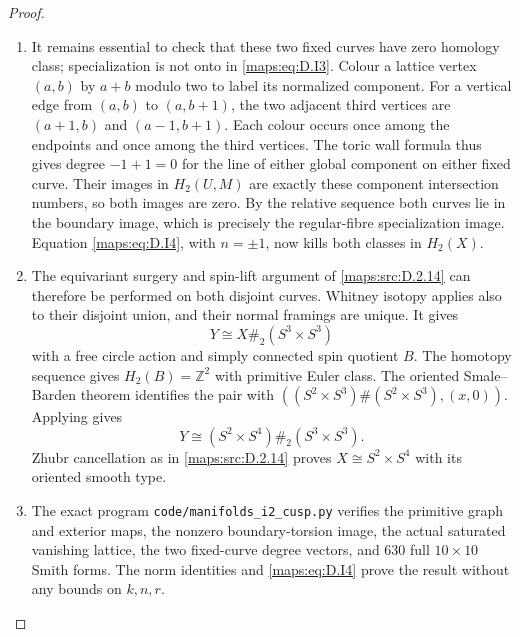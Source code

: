 \begin{proof}
\begin{enumerate}[label=\arabic*.,leftmargin=*]
\item It remains essential to check that these two fixed curves
have zero homology class; specialization is not onto in
\eqref{maps:eq:D.I3}. Colour a lattice vertex $(a,b)$ by $a+b$ modulo
two to label its normalized component. For a vertical
edge from $(a,b)$ to $(a,b+1)$, the two adjacent third
vertices are $(a+1,b)$ and $(a-1,b+1)$.
Each colour occurs once among the endpoints and once
among the third vertices. The toric wall formula thus
gives degree $-1+1=0$ for the line of either global
component on either fixed curve. Their images in
$H_2(U,M)$ are exactly these component intersection
numbers, so both images are zero. By the relative
sequence both curves lie in the boundary image, which
is precisely the regular-fibre specialization image.
Equation \eqref{maps:eq:D.I4}, with $n=\pm1$, now kills both classes
in $H_2(X)$.

\item The equivariant surgery and spin-lift argument of \ref{maps:src:D.2.14}
can therefore be performed on both disjoint curves.
Whitney isotopy applies also to their disjoint union,
and their normal framings are unique. It gives
\[
            Y\cong X\#_2(S^3\times S^3)
\]
with a free circle action and simply connected spin
quotient $B$. The homotopy sequence gives
$H_2(B)=\mathbb Z^2$ with primitive Euler class.
The oriented Smale--Barden theorem identifies the pair
with $((S^2\times S^3)\#(S^2\times S^3),(x,0))$.
Applying \cite[Theorem A and Theorem B(2)]{manGR25}
gives
\[
              Y\cong(S^2\times S^4)\#_2(S^3\times S^3).
\]
Zhubr cancellation as in \ref{maps:src:D.2.14} proves
$X\cong S^2\times S^4$ with its oriented smooth type.

\item The exact program \texttt{code/manifolds\_i2\_cusp.py}
verifies the primitive graph and exterior maps, the
nonzero boundary-torsion image, the actual saturated
vanishing lattice, the two fixed-curve degree vectors,
and 630 full $10\times10$ Smith forms.
The norm identities and \eqref{maps:eq:D.I4} prove the result without
any bounds on $k,n,r$.
\end{enumerate}
\end{proof}

